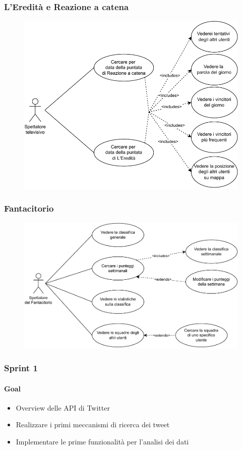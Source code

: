 \documentclass{beamer}
\begin{document}
\begin{frame}
  \frametitle{L'Eredità e Reazione a catena}
  \begin{figure}[H]
      \centering
      \includegraphics[scale=0.6]{../img/usecase/tvgames.pdf}
  \end{figure}
\end{frame}


\begin{frame}
  \frametitle{Fantacitorio}
  \begin{figure}[H]
      \centering
      \includegraphics[scale=0.6]{../img/usecase/fantacitorio.pdf}
  \end{figure}
\end{frame}


\begin{frame}
  \frametitle{Sprint 1}
  \framesubtitle{Goal}

  \begin{itemize}
    \item Overview delle API di Twitter
    \item Realizzare i primi meccanismi di ricerca dei tweet
    \item Implementare le prime funzionalità per l'analisi dei dati
  \end{itemize}

\end{frame}
\end{document}
